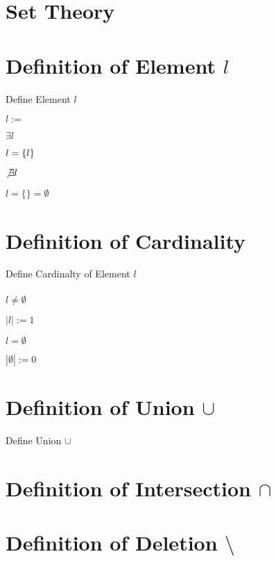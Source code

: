 \documentclass[11pt]{article}
\begin{document}
\section*{Set Theory}



\section{Definition of Element $l$}
Define Element $l$
\begin{center}
$
l :=
$
\end{center}
\vspace{3mm}
$\exists l$
\begin{center}
$
l = \{l\} \hspace{4mm}
$
\end{center}
\vspace{3mm}
$\not \exists l$
\begin{center}
$
l = \{\} = \emptyset
$
\end{center}




\section{Definition of Cardinality}
Define Cardinalty of Element $l$\\
\\
$l \neq \emptyset$
\begin{center}
$
|l| := 1
$
\end{center}
\vspace{3mm}
$l = \emptyset$
\begin{center}
$
|\emptyset| := 0
$
\end{center}



\section{Definition of Union $\cup$}
Define Union $\cup$




\section{Definition of Intersection $\cap$}
\section{Definition of Deletion $\setminus$}
\end{document}
